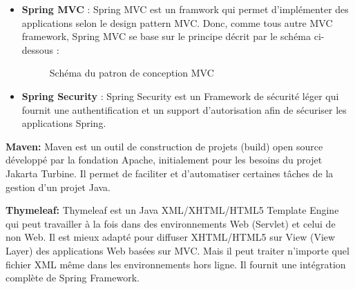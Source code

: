 \documentclass[a4paper]{article}
\begin{document}
\begin{itemize}
	\item \textbf{Spring MVC} : Spring MVC est un framwork qui permet d’implémenter des applications selon le design pattern MVC. Donc, comme tous autre MVC framework, Spring MVC se base sur le principe décrit par le schéma ci-dessous :
	

\begin{figure}[H]
	\centering
  		\caption{Schéma du patron de conception MVC}
	\end{figure}
	
	\item \textbf{Spring Security }: Spring Security est un Framework de sécurité léger qui fournit une authentification et un support d’autorisation afin de sécuriser les applications Spring.
\end{itemize} 

\textbf{Maven:} Maven est un outil de construction de projets (build) open source développé par la fondation Apache, initialement pour les besoins du projet Jakarta Turbine. Il permet de faciliter et d'automatiser certaines tâches de la gestion d'un projet Java.

\textbf{Thymeleaf:} Thymeleaf est un  Java XML/XHTML/HTML5 Template Engine qui peut travailler à la fois dans des environnements Web (Servlet) et celui de non Web. Il est mieux adapté pour diffuser XHTML/HTML5 sur View (View Layer) des applications Web basées sur MVC. Mais il peut traiter n'importe quel fichier XML même dans les environnements hors ligne. Il fournit une intégration complète de Spring Framework. 
\end{document}
